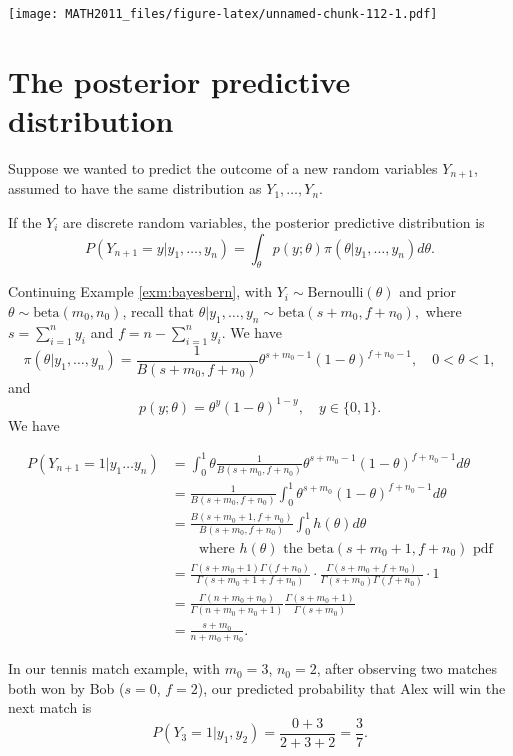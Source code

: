 \documentclass[]{book}
\theoremstyle{definition}
\theoremstyle{definition}
\theoremstyle{definition}
\theoremstyle{remark}
\let\BeginKnitrBlock\begin \let\EndKnitrBlock\end
\begin{document}
\texttt{[image: MATH2011\_files/figure-latex/unnamed-chunk-112-1.pdf]}

\section{The posterior predictive
distribution}\label{the-posterior-predictive-distribution}

Suppose we wanted to predict the outcome of a new random variables
\(Y_{n+1}\), assumed to have the same distribution as
\(Y_1, \ldots, Y_n\).

If the \(Y_i\) are discrete random variables, the posterior predictive
distribution is
\[P(Y_{n+1} = y | y_1, \ldots, y_n) = \int_\theta p(y; \theta) \pi(\theta | y_1, \ldots, y_n) d \theta. \]

\BeginKnitrBlock{example}[Bernoulli]
\protect\hypertarget{exm:unnamed-chunk-113}{}{\label{exm:unnamed-chunk-113}
\iffalse (Bernoulli) \fi{} }Continuing Example \ref{exm:bayesbern}, with
\(Y_i \sim \text{Bernoulli}(\theta)\) and prior
\(\theta \sim \text{beta}(m_0, n_0)\), recall that
\(\theta|y_1, \ldots, y_n \sim \text{beta}(s + m_0, f + n_0),\) where
\(s = \sum_{i=1}^n y_i\) and \(f = n - \sum_{i=1}^n y_i\). We have
\[\pi(\theta|y_1, \ldots, y_n) = \frac{1}{B(s + m_0, f + n_0)} \theta^{s + m_0 - 1}
(1 - \theta)^{f + n_0 - 1}, \quad 0 < \theta < 1,\] and
\[p(y; \theta) = \theta^y (1 - \theta)^{1 - y}, \quad y \in \{0, 1\}.\]
We have

\begin{align*}
P(Y_{n+1} = 1 | y_1 \ldots y_n) &= \int_0^1 \theta
 \frac{1}{B(s + m_0, f + n_0)} \theta^{s + m_0 - 1}
(1 - \theta)^{f + n_0 - 1} d\theta \\
&= \frac{1}{B(s + m_0, f + n_0)}  \int_0^1 \theta^{s + m_0}
(1 - \theta)^{f + n_0 - 1} d \theta \\
&= \frac{B(s + m_0 + 1, f + n_0)}{B(s + m_0, f + n_0)} 
 \int_0^1 h(\theta) d \theta \\
 & \quad \quad \text{where $h(\theta)$ the $\text{beta}(s + m_0 + 1, f + n_0)$ pdf} \\
&= \frac{\Gamma(s + m_0 + 1) \Gamma(f + n_0)}{\Gamma(s + m_0 + 1 + f + n_0)}
 \cdot
\frac{\Gamma(s + m_0 + f + n_0)}{\Gamma(s + m_0)\Gamma(f + n_0)} \cdot 1 \\
&= \frac{\Gamma(n + m_0 + n_0)}{\Gamma(n + m_0 + n_0 + 1)} 
\frac{\Gamma(s + m_0 + 1)}{\Gamma(s + m_0)}  \\
&= \frac{s+m_0}{n + m_0 + n_0}.
\end{align*}

In our tennis match example, with \(m_0 = 3\), \(n_0 = 2\), after
observing two matches both won by Bob (\(s = 0\), \(f = 2\)), our
predicted probability that Alex will win the next match is
\[P(Y_3 = 1 | y_1, y_2) = \frac{0 + 3}{2 + 3 + 2}= \frac{3}{7}.\]
\EndKnitrBlock{example}
\end{document}
